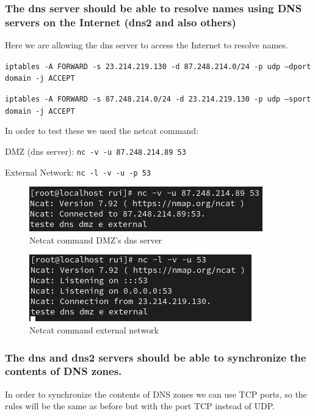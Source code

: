 \documentclass{article}
\begin{document}
\subsubsection{ The dns server should be able to resolve names using DNS servers on the Internet (dns2 and also others)}
\texttt{}\par
Here we are allowing the dns server to access the Internet to resolve names.

\texttt{}\par
\texttt{iptables -A FORWARD -s 23.214.219.130 -d 87.248.214.0/24 -p udp --dport domain -j ACCEPT}\par
\texttt{iptables -A FORWARD -s 87.248.214.0/24 -d 23.214.219.130 -p udp --sport domain -j ACCEPT}\par
\texttt{}\par

In order to test these we used the netcat command:
\texttt{}\par
\texttt{}\par
DMZ (dns server): \texttt{nc -v -u 87.248.214.89 53} \par
External Network: \texttt{nc -l -v -u -p 53} \par
\texttt{}\par
\begin{figure}[H]
    \centering
    \includegraphics[scale=0.5]{btw/btw_dns_external_dmz_newip.png}
    \caption{Netcat command DMZ's dns server}
    \label{fig:network-arc}
\end{figure}

\begin{figure}[H]
    \centering
    \includegraphics[scale=0.5]{btw/btw_dns_external_external_newip.png}
    \caption{Netcat command external network}
    \label{fig:network-arc}
\end{figure}



\subsubsection{ The dns and dns2 servers should be able to synchronize the contents of DNS zones.}
\texttt{}\par
In order to synchronize the contents of DNS zones we can use TCP ports, so the rules will be the same as before but with the port TCP instead of UDP.
\end{document}
